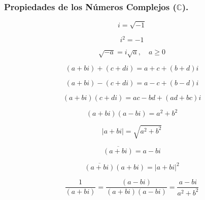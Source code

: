 \documentclass[12pt, twocolumn, landscape, a4paper]{article}
\begin{document}
\subsubsection*{Propiedades de los Números Complejos ($\mathbb{C}$).}
$$
i = \sqrt{-1}
$$

$$
i^2 = -1
$$

$$
\sqrt{-a} = i\sqrt{a},\quad a \ge 0
$$

$$
(a + bi) + (c + di) = a + c + (b + d)i
$$

$$
(a + bi) - (c + di) = a - c + (b - d)i
$$

$$
(a + bi)(c + di) = ac - bd + (ad + bc)i
$$

$$
(a + bi)(a - bi) = a^2 + b^2
$$

$$
\vert a + bi \vert = \sqrt{a^2 + b^2}
$$

$$
\overline{(a + bi)} = a - bi
$$

$$
\overline{(a + bi)}(a + bi) = \vert a + bi\vert^2
$$

$$
\dfrac{1}{(a + bi)} = \dfrac{(a - bi)}{(a + bi)(a - bi)} = \dfrac{a - bi}{a^2 + b^2}
$$
\end{document}
